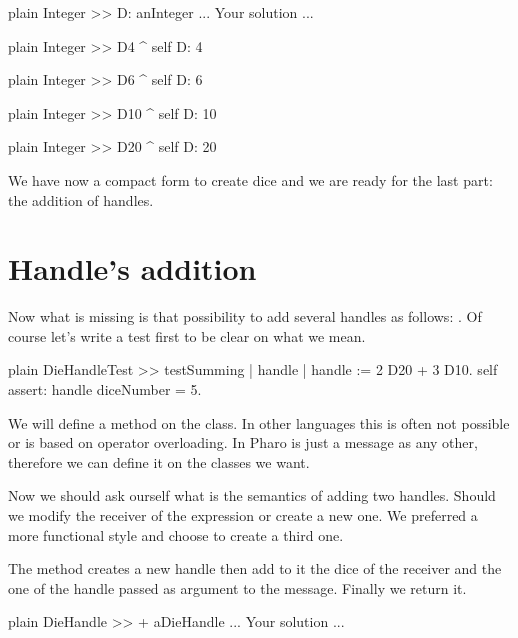 \documentclass[10pt,twoside,english]{_support/latex/sbabook/sbabook}
\begin{document}
\begin{displaycode}{plain}
Integer >> D: anInteger
	... Your solution ...
\end{displaycode}

\begin{displaycode}{plain}
Integer >> D4
	^ self D: 4
\end{displaycode}

\begin{displaycode}{plain}
Integer >> D6
	^ self D: 6
\end{displaycode}

\begin{displaycode}{plain}
Integer >> D10
	^ self D: 10
\end{displaycode}

\begin{displaycode}{plain}
Integer >> D20
	^ self D: 20
\end{displaycode}

We have now a compact form to create dice and we are ready for the last part: the addition of handles. 
\section{Handle's addition}
Now what is missing is that possibility to add several handles as follows: . Of course let's write a test first to be clear on what we mean.

\begin{displaycode}{plain}
DieHandleTest >> testSumming
	| handle |
	handle := 2 D20 + 3 D10.
	self assert: handle diceNumber = 5.
\end{displaycode}

We will define a method \textcode{+} on the  class. In other languages this is often not possible or is based on operator overloading. In Pharo \textcode{+} is just a message as any other, therefore we can define it on the classes we want.

Now we should ask ourself what is the semantics of adding two handles. Should we modify the receiver of the expression or create a new one. We preferred a more functional style and choose to create a third one. 

The method \textcode{+} creates a new handle then add to it the dice of the receiver and the one of the handle passed as argument to the message. Finally we return it. 

\begin{displaycode}{plain}
DieHandle >> + aDieHandle
	... Your solution ... 
\end{displaycode}
\end{document}

